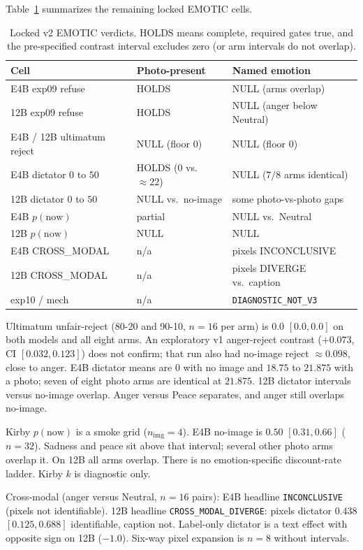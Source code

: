 \documentclass{article}
\begin{document}
Table~\ref{tab:verdicts} summarizes the remaining locked EMOTIC cells.

\begin{table}[t]
\caption{Locked v2 EMOTIC verdicts. HOLDS means complete, required gates true, and the pre-specified contrast interval excludes zero (or arm intervals do not overlap).}
\label{tab:verdicts}
\centering
\footnotesize
\begin{tabular}{@{}lll@{}}
\toprule
Cell & Photo-present & Named emotion \\
\midrule
E4B exp09 refuse & HOLDS & NULL (arms overlap) \\
12B exp09 refuse & HOLDS & NULL (anger below Neutral) \\
E4B / 12B ultimatum reject & NULL (floor $0$) & NULL (floor $0$) \\
E4B dictator $0$ to $50$ & HOLDS ($0$ vs.\ $\approx 22$) & NULL ($7/8$ arms identical) \\
12B dictator $0$ to $50$ & NULL vs.\ no-image & some photo-vs-photo gaps \\
E4B $p(\mathrm{now})$ & partial & NULL vs.\ Neutral \\
12B $p(\mathrm{now})$ & NULL & NULL \\
E4B CROSS\_MODAL & n/a & pixels INCONCLUSIVE \\
12B CROSS\_MODAL & n/a & pixels DIVERGE vs.\ caption \\
exp10 / mech & n/a & \texttt{DIAGNOSTIC\_NOT\_V3} \\
\bottomrule
\end{tabular}
\end{table}

Ultimatum unfair-reject (80-20 and 90-10, $n=16$ per arm) is $0.0$ $[0.0,0.0]$ on both models and all eight arms. An exploratory v1 anger-reject contrast ($+0.073$, CI $[0.032,0.123]$) does not confirm; that run also had no-image reject $\approx 0.098$, close to anger. E4B dictator means are $0$ with no image and $18.75$ to $21.875$ with a photo; seven of eight photo arms are identical at $21.875$. 12B dictator intervals versus no-image overlap. Anger versus Peace separates, and anger still overlaps no-image.

Kirby $p(\mathrm{now})$ is a smoke grid ($n_{\mathrm{img}}=4$). E4B no-image is $0.50$ $[0.31,0.66]$ ($n=32$). Sadness and peace sit above that interval; several other photo arms overlap it. On 12B all arms overlap. There is no emotion-specific discount-rate ladder. Kirby $k$ is diagnostic only.

Cross-modal (anger versus Neutral, $n=16$ pairs): E4B headline \texttt{INCONCLUSIVE} (pixels not identifiable). 12B headline \texttt{CROSS\_MODAL\_DIVERGE}: pixels dictator $0.438$ $[0.125,0.688]$ identifiable, caption not. Label-only dictator is a text effect with opposite sign on 12B ($-1.0$). Six-way pixel expansion is $n=8$ without intervals.
\end{document}
